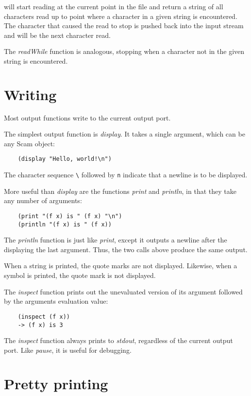 will start reading at the current point in the file
and return a string of all characters read up to point
where a character in a given string is encountered.
The character that caused the read to stop is pushed
back into the input stream and will be the next character
read.

The {\it readWhile} function is analogous, stopping when
a character not in the given string is encountered.

\section{Writing}

Most output functions write to the current output port.

The simplest output function is {\it display}. It takes a single
argument, which can be any Scam object:

\begin{verbatim}
    (display "Hello, world!\n")
\end{verbatim}

The character sequence \verb!\! followed by
\verb!n! indicate that
a newline is to be displayed.

More useful than {\it display} are the functions {\it print} and
{\it println}, in that they take any number of arguments:

\begin{verbatim}
    (print "(f x) is " (f x) "\n")
    (println "(f x) is " (f x))
\end{verbatim}

The {\it println} function is just like {\it print}, except it
outputs a newline after the displaying the last argument.
Thus, the two calls above produce the same output.

When a string is printed, the quote marks are not displayed.
Likewise, when a symbol is printed, the quote mark is not displayed.

The {\it inspect} function 
prints out the unevaluated
version of its argument followed by the arguments evaluation value:

\begin{verbatim}
    (inspect (f x))
    -> (f x) is 3
\end{verbatim}

The {\it inspect} function always prints to {\it stdout},
regardless of the current output port. Like {\it pause}, it is
useful for debugging.

\section{Pretty printing}

